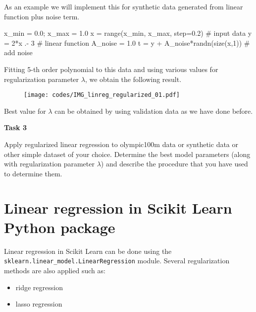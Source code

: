 \documentclass[a4paper,11pt]{article} %
\newcommand{\pyinline}[1]{\texttt{#1}}
\begin{document}
As an example we will implement this for synthetic data generated from linear
function plus noise term.
\begin{juliacode}
x_min = 0.0; x_max = 1.0
x = range(x_min, x_max, step=0.2) # input data
y = 2*x .- 3 # linear function
A_noise = 1.0
t = y + A_noise*randn(size(x,1)) # add noise
\end{juliacode}
Fitting 5-th order polynomial to this data and using various values for regularization
parameter $\lambda$, we obtain the following result.
\begin{figure}[H]
\begin{center}
\texttt{[image: codes/IMG\_linreg\_regularized\_01.pdf]}
\end{center}
\end{figure}
Best value for $\lambda$ can be obtained by using validation data as we have done before.

\begin{mdframed}
\textbf{Task 3}

Apply regularized linear regression to olympic100m data or synthetic data or other simple
dataset of your choice. Determine the best model parameters (along with regularization
parameter $\lambda$)
and describe the procedure that you have used to determine them.
\end{mdframed}

\section{Linear regression in Scikit Learn Python package}
Linear regression in Scikit Learn \cite{scikit-learn} can be done using the
\pyinline{sklearn.linear_model.LinearRegression} module.
Several regularization methods are also applied such as:
\begin{itemize}
\item ridge regression
\item lasso regression
\end{itemize}




\end{document}
